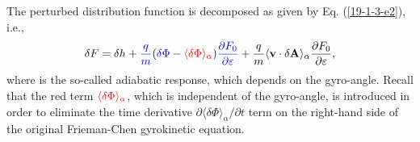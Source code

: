 \documentclass{llncs}
\newcommand{\tmcolor}[2]{{\color{#1}{#2}}}
\begin{document}
The perturbed distribution function is decomposed as given by Eq.
(\ref{19-1-3-e2}), i.e.,
\begin{equation}
  \delta F = \delta h + \tmcolor{blue}{\frac{q}{m}} (\tmcolor{blue}{\delta
  \Phi} - \tmcolor{red}{\langle \delta \Phi \rangle_{\alpha}})
  \tmcolor{blue}{\frac{\partial F_0}{\partial \varepsilon}} + \frac{q}{m}
  \langle \mathbf{v} \cdot \delta \mathbf{A} \rangle_{\alpha} \frac{\partial
  F_0}{\partial \varepsilon},
\end{equation}
where \tmcolor{blue}{the term in blue} is the so-called adiabatic response,
which depends on the gyro-angle. Recall that the red term
$\tmcolor{red}{\langle \delta \Phi \rangle_{\alpha}}$, which is independent of
the gyro-angle, is introduced in order to eliminate the time derivative
$\partial \langle \delta \Phi \rangle_{\alpha} / \partial t$ term on the
right-hand side of the original Frieman-Chen gyrokinetic equation.
\end{document}
